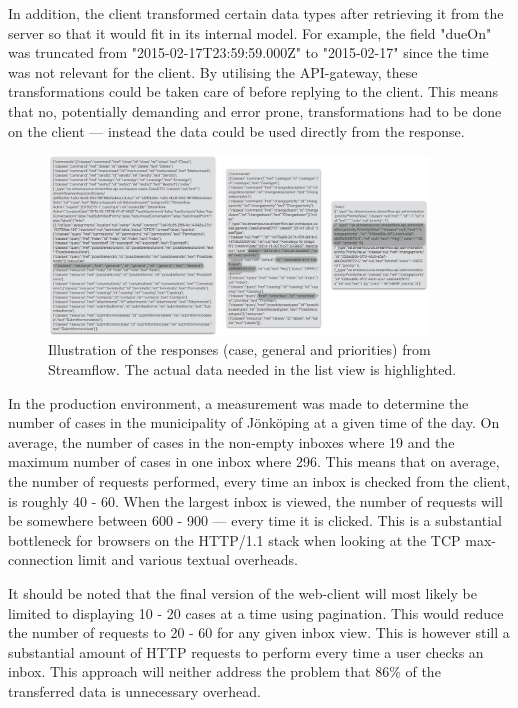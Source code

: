 \documentclass{cslthse-msc}
\begin{document}
In addition, the client transformed certain data types after retrieving it from the server so that it would fit in its internal model. For example, the field "dueOn" was truncated from "2015-02-17T23:59:59.000Z" to "2015-02-17" since the time was not relevant for the client. By utilising the API-gateway, these transformations could be taken care of before replying to the client. This means that no, potentially demanding and error prone, transformations had to be done on the client --- instead the data could be used directly from the response.

\begin{figure}[H]
  \centering
    \begin{center}
      \includegraphics[width=0.9\textwidth]{images/streamflow_response.png}
    \end{center}
  \caption{Illustration of the responses (case, general and priorities) from Streamflow. The actual data needed in the list view is highlighted.}
\end{figure}

In the production environment, a measurement was made to determine the number of cases in the municipality of Jönköping at a given time of the day. On average, the number of cases in the non-empty inboxes where 19 and the maximum number of cases in one inbox where 296. This means that on average, the number of requests performed, every time an inbox is checked from the client, is roughly 40 - 60. When the largest inbox is viewed, the number of requests will be somewhere between 600 - 900 --- every time it is clicked. This is a substantial bottleneck for browsers on the HTTP/1.1 stack when looking at the TCP max-connection limit and various textual overheads.

It should be noted that the final version of the web-client will most likely be limited to displaying 10 - 20 cases at a time using pagination. This would reduce the number of requests to 20 - 60 for any given inbox view. This is however still a substantial amount of HTTP requests to perform every time a user checks an inbox. This approach will neither address the problem that 86\% of the transferred data is unnecessary overhead.
\end{document}
